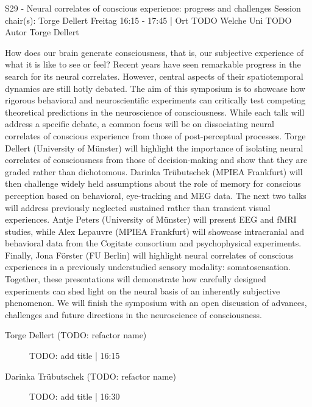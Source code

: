 
            \begin{symposium}
            {S29 - Neural correlates of conscious experience: progress and challenges}
            {Session chair(s): Torge Dellert}
            {Freitag 16:15 - 17:45 | Ort TODO}
            {Welche Uni TODO}
            Autor Torge Dellert

How does our brain generate consciousness, that is, our subjective experience of what it is like to see or feel? Recent years have seen remarkable progress in the search for its neural correlates. However, central aspects of their spatiotemporal dynamics are still hotly debated. The aim of this symposium is to showcase how rigorous behavioral and neuroscientific experiments can critically test competing theoretical predictions in the neuroscience of consciousness. While each talk will address a specific debate, a common focus will be on dissociating neural correlates of conscious experience from those of post-perceptual processes.
Torge Dellert (University of Münster) will highlight the importance of isolating neural correlates of consciousness from those of decision-making and show that they are graded rather than dichotomous. Darinka Trübutschek (MPIEA Frankfurt) will then challenge widely held assumptions about the role of memory for conscious perception based on behavioral, eye-tracking and MEG data. The next two talks will address previously neglected sustained rather than transient visual experiences. Antje Peters (University of Münster) will present EEG and fMRI studies, while Alex Lepauvre (MPIEA Frankfurt) will showcase intracranial and behavioral data from the Cogitate consortium and psychophysical experiments. Finally, Jona Förster (FU Berlin) will highlight neural correlates of conscious experiences in a previously understudied sensory modality: somatosensation.
Together, these presentations will demonstrate how carefully designed experiments can shed light on the neural basis of an inherently subjective phenomenon. We will finish the symposium with an open discussion of advances, challenges and future directions in the neuroscience of consciousness.
            \begin{description}    
            
                \item [Torge Dellert  (TODO: refactor name)] TODO: add title \textcolor{mygray}{ | 16:15}    
                
                \item [Darinka Trübutschek (TODO: refactor name)] TODO: add title \textcolor{mygray}{ | 16:30}    
                

\end{description}
\end{symposium}
